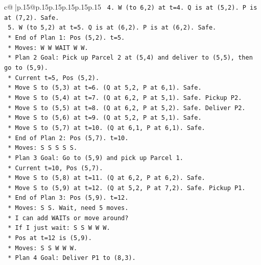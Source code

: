 \documentclass{article}
\begin{document}
{\begin{supertabular}{c@{$\;$}|p{.15\linewidth}@{}p{.15\linewidth}p{.15\linewidth}p{.15\linewidth}p{.15\linewidth}p{.15\linewidth}}
{{{\texttt{                4.  W (to 6,2) at t=4. Q is at (5,2). P is at (7,2). Safe.} \\
\texttt{                5.  W (to 5,2) at t=5. Q is at (6,2). P is at (6,2). Safe.} \\
\texttt{                *   End of Plan 1: Pos (5,2). t=5.} \\
\texttt{                *   Moves: W W WAIT W W.} \\
\texttt{            *   Plan 2 Goal: Pick up Parcel 2 at (5,4) and deliver to (5,5), then go to (5,9).} \\
\texttt{                *   Current t=5, Pos (5,2).} \\
\texttt{                *   Move S to (5,3) at t=6. (Q at 5,2, P at 6,1). Safe.} \\
\texttt{                *   Move S to (5,4) at t=7. (Q at 6,2, P at 5,1). Safe. Pickup P2.} \\
\texttt{                *   Move S to (5,5) at t=8. (Q at 6,2, P at 5,2). Safe. Deliver P2.} \\
\texttt{                *   Move S to (5,6) at t=9. (Q at 5,2, P at 5,1). Safe.} \\
\texttt{                *   Move S to (5,7) at t=10. (Q at 6,1, P at 6,1). Safe.} \\
\texttt{                *   End of Plan 2: Pos (5,7). t=10.} \\
\texttt{                *   Moves: S S S S S.} \\
\texttt{            *   Plan 3 Goal: Go to (5,9) and pick up Parcel 1.} \\
\texttt{                *   Current t=10, Pos (5,7).} \\
\texttt{                *   Move S to (5,8) at t=11. (Q at 6,2, P at 6,2). Safe.} \\
\texttt{                *   Move S to (5,9) at t=12. (Q at 5,2, P at 7,2). Safe. Pickup P1.} \\
\texttt{                *   End of Plan 3: Pos (5,9). t=12.} \\
\texttt{                *   Moves: S S. Wait, need 5 moves.} \\
\texttt{                *   I can add WAITs or move around?} \\
\texttt{                *   If I just wait: S S W W W.} \\
\texttt{                *   Pos at t=12 is (5,9).} \\
\texttt{                *   Moves: S S W W W.} \\
\texttt{            *   Plan 4 Goal: Deliver P1 to (8,3).} \\
}}}
\end{supertabular}}
\end{document}
